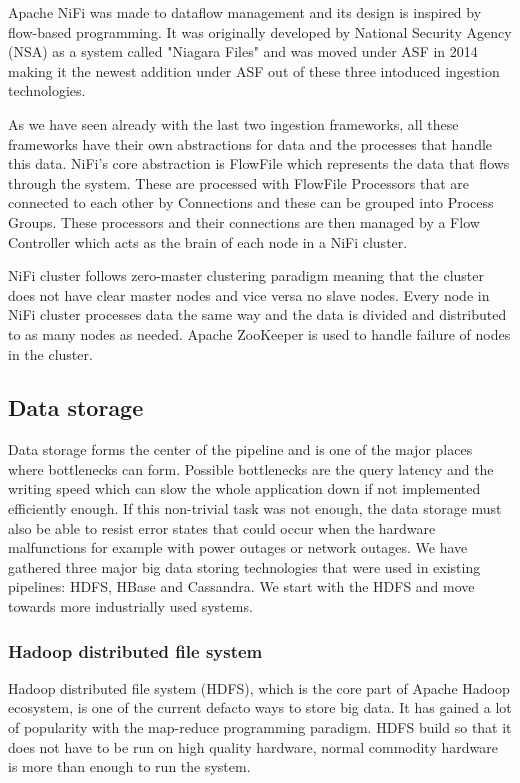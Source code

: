 Apache NiFi was made to dataflow management and its design is inspired by flow-based programming.
It was originally developed by National Security Agency (NSA) as a system called "Niagara Files" and was moved under ASF in 2014 making it the newest addition under ASF out of these three intoduced ingestion technologies. \cite{bridgwater}

As we have seen already with the last two ingestion frameworks, all these frameworks have their own abstractions for data and the processes that handle this data.
NiFi's core abstraction is FlowFile which represents the data that flows through the system. 
These are processed with FlowFile Processors that are connected to each other by Connections and these can be grouped into Process Groups.
These processors and their connections are then managed by a Flow Controller which acts as the brain of each node in a NiFi cluster. \cite{nifi}

NiFi cluster follows zero-master clustering paradigm meaning that the cluster does not have clear master nodes and vice versa no slave nodes.
Every node in NiFi cluster processes data the same way and the data is divided and distributed to as many nodes as needed.
Apache ZooKeeper is used to handle failure of nodes in the cluster.\cite{nifi}

\subsection{Data storage}

Data storage forms the center of the pipeline and is one of the major places where bottlenecks can form.
Possible bottlenecks are the query latency and the writing speed which can slow the whole application down if not implemented efficiently enough.
If this non-trivial task was not enough, the data storage must also be able to resist error states that could occur when the hardware malfunctions for example with power outages or network outages.
We have gathered three major big data storing technologies that were used in existing pipelines: HDFS, HBase and Cassandra.
We start with the HDFS and move towards more industrially used systems.

\subsubsection{Hadoop distributed file system}

Hadoop distributed file system (HDFS), which is the core part of Apache Hadoop ecosystem, is one of the current defacto ways to store big data.
It has gained a lot of popularity with the map-reduce programming paradigm.
HDFS build so that it does not have to be run on high quality hardware, normal commodity hardware is more than enough to run the system.\cite{hdfs}

